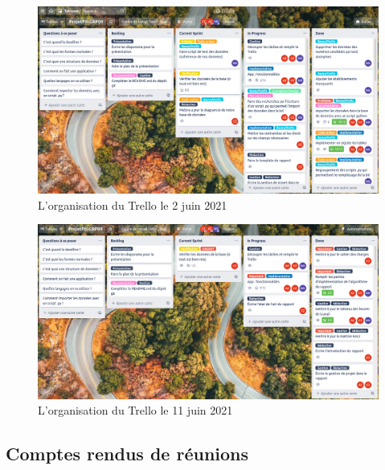 \documentclass[12pt]{article}
\begin{document}
        \begin{figure}[!h]
            \centering
            \includegraphics[scale = 0.37]{Images/Gestion de Projet/Trello/Trello_02062021.png}
            \caption{L'organisation du Trello le 2 juin 2021}
            \label{fig:Trello02062021}
        \end{figure}
\newpage
        \begin{figure}[!h]
            \centering
            \includegraphics[scale = 0.37]{Images/Gestion de Projet/Trello/Trello_11062021.png}
            \caption{L'organisation du Trello le 11 juin 2021}
            \label{fig:Trello11062021}
        \end{figure}

\newpage

\subsection*{Comptes rendus de réunions}
    
    \newpage
    
    \newpage
    
    \newpage
    
    \newpage
    
    \newpage
    
    \newpage
    
    \newpage
    
    \newpage
    
    \newpage


\listoffigures
\listoftables

\newpage



\end{document}
